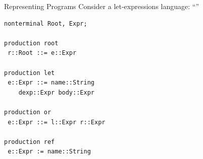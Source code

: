 \documentclass[11pt,aspectratio=169]{beamer}
\newcommand{\ys}{1.3}
\newcommand{\enve}[2]{\draw[blue] ($(#1-0.4,\ys*#2-0.35)$) circle(0.15);}
\newcommand{\envd}[2]{\filldraw[blue] ($(#1-0.4,\ys*#2-0.35)$) circle(0.05);}
\newcommand{\envc}[2]{\filldraw[blue] ($(#1-0.4,\ys*#2-0.35)$) circle(0.15);}
\newcommand{\ppe}[2]{\draw[dgreen] ($(#1+0.4,\ys*#2-0.35)$) circle(0.15);}
\newcommand{\ppd}[2]{\filldraw[dgreen] ($(#1+0.4,\ys*#2-0.35)$) circle(0.05);}
\newcommand{\ppc}[2]{\filldraw[dgreen] ($(#1+0.4,\ys*#2-0.35)$) circle(0.15);}
\newcommand{\vale}[2]{\draw[red] ($(#1+0.8,\ys*#2-0.35)$) circle(0.15);}
\newcommand{\vald}[2]{\filldraw[red] ($(#1+0.8,\ys*#2-0.35)$) circle(0.05);}
\newcommand{\valc}[2]{\filldraw[red] ($(#1+0.8,\ys*#2-0.35)$) circle(0.15);}
\newcommand{\erre}[2]{\draw[orange] ($(#1+1.2,\ys*#2-0.35)$) circle(0.15);}
\newcommand{\rtnna}[3]{
\draw ($(#1,#2*\ys)$) node{#3};

\draw[gray] ($(#1+0.65,\ys*#2+0.25)$) --
            ($(#1-0.3,\ys*#2+0.25)$) arc (90:270:4.5mm);

\draw[gray] ($(#1+0.65,\ys*#2+0.25)$) arc (90:-90:4.5mm) -- 
            ($(#1-0.3,\ys*#2-0.65)$) ;
}
\newcommand{\tnna}[3]{
\rtnna{#1}{#2}{#3}
}
\newcommand{\tnstr}[3]{
\draw ($(#1,#2*\ys)$) node{#3};
\draw[gray] ($(#1+0.25,\ys*#2+0.25)$) --
            ($(#1-0.2,\ys*#2+0.25)$) arc (90:270:2.5mm);

\draw[gray] ($(#1+0.25,\ys*#2+0.25)$) arc (90:-90:2.5mm) -- 
            ($(#1-0.2,\ys*#2-0.25)$) ;

}
\newcommand{\tedge}[4]{
\draw[gray] ($(#1+\xsh,\ys*#2-0.65)$) -- ($(#3+\xsh,\ys*#4+0.25)$);
}
\newcommand{\ppeval}{
\pause
\ppd{4}{4} %
\pause
\ppd{4}{3} %

\pause
\ppd{4}{2} %
\pause
\ppc{4}{2} %
\pause
\ppd{6.5}{2}  %

\pause
\ppd{5.25}{1} %
\pause
\ppc{5.25}{1} %
\pause
\ppd{7.75}{1} %
\pause
\ppc{7.75}{1} %

\pause
\ppc{6.5}{2}  %

\pause
\ppc{4}{3} %

\pause
\ppc{4}{4} %
}
\newcommand{\valeval}{
\pause\vald{4}{4} %
\pause\vald{4}{3} %

\pause\vald{6.5}{2}  %
\pause\vald{5.25}{1} %
\pause\valc{5.25}{1} %

\pause\vald{7.75}{1} %

\pause\envd{7.75}{1} %

\pause\envd{6.5}{2}  %

\pause
\draw ($(5.5,\ys*-0.5)$) node {\small\texttt{body.env = (name, dexp.val) :: e.env;}};

\pause\vald{4}{2} %
\pause\valc{4}{2} %

\pause\envd{4}{3} %
\pause\envc{4}{3} %

\pause\envc{6.5}{2}  %

\pause

\pause\envc{7.75}{1} %

\pause\valc{7.75}{1} %
\pause\valc{6.5}{2}  %

\pause\valc{4}{3} %

\pause\valc{4}{4} %
}
\newcommand{\xsh}{0.15}
\begin{document}
\begin{frame}[t,fragile]{Representing Programs}
Consider a let-expressions language: 
``''

\bigskip

\begin{minipage}[t]{2.9in}
\vspace{0pt}
\end{minipage}
\begin{minipage}[t]{2.1in}
\vspace{0pt}
\small
\begin{verbatim}
nonterminal Root, Expr;

production root
 r::Root ::= e::Expr

production let
 e::Expr ::= name::String 
    dexp::Expr body::Expr

production or
 e::Expr ::= l::Expr r::Expr

production ref
 e::Expr := name::String
\end{verbatim}
\end{minipage}

\end{frame}
\end{document}
